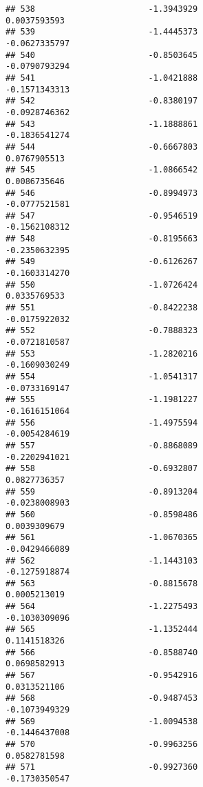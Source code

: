 \documentclass[
]{article}
\begin{document}
\begin{verbatim}
## 538                       -1.3943929                          0.0037593593
## 539                       -1.4445373                         -0.0627335797
## 540                       -0.8503645                         -0.0790793294
## 541                       -1.0421888                         -0.1571343313
## 542                       -0.8380197                         -0.0928746362
## 543                       -1.1888861                         -0.1836541274
## 544                       -0.6667803                          0.0767905513
## 545                       -1.0866542                          0.0086735646
## 546                       -0.8994973                         -0.0777521581
## 547                       -0.9546519                         -0.1562108312
## 548                       -0.8195663                         -0.2350632395
## 549                       -0.6126267                         -0.1603314270
## 550                       -1.0726424                          0.0335769533
## 551                       -0.8422238                         -0.0175922032
## 552                       -0.7888323                         -0.0721810587
## 553                       -1.2820216                         -0.1609030249
## 554                       -1.0541317                         -0.0733169147
## 555                       -1.1981227                         -0.1616151064
## 556                       -1.4975594                         -0.0054284619
## 557                       -0.8868089                         -0.2202941021
## 558                       -0.6932807                          0.0827736357
## 559                       -0.8913204                         -0.0238008903
## 560                       -0.8598486                          0.0039309679
## 561                       -1.0670365                         -0.0429466089
## 562                       -1.1443103                         -0.1275918874
## 563                       -0.8815678                          0.0005213019
## 564                       -1.2275493                         -0.1030309096
## 565                       -1.1352444                          0.1141518326
## 566                       -0.8588740                          0.0698582913
## 567                       -0.9542916                          0.0313521106
## 568                       -0.9487453                         -0.1073949329
## 569                       -1.0094538                         -0.1446437008
## 570                       -0.9963256                          0.0582781598
## 571                       -0.9927360                         -0.1730350547

\end{verbatim}
\end{document}
